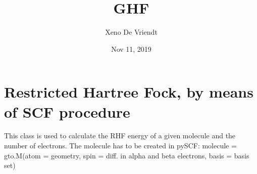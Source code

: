 \documentclass[letterpaper,10pt,english]{sphinxmanual}
\title{GHF}
\date{Nov 11, 2019}
\author{Xeno De Vriendt}
\begin{document}
\pagestyle{empty}
\sphinxmaketitle
\pagestyle{plain}
\sphinxtableofcontents
\pagestyle{normal}
\label{\detokenize{index::doc}}

\label{\detokenize{RHF:module-ghf.RHF}}

\chapter{Restricted Hartree Fock, by means of SCF procedure}
\label{\detokenize{RHF:restricted-hartree-fock-by-means-of-scf-procedure}}\label{\detokenize{RHF::doc}}
This class is used to calculate the RHF energy of a given molecule and the number of electrons.
The molecule has to be created in pySCF:
molecule = gto.M(atom = geometry, spin = diff. in alpha and beta electrons, basis = basis set)
\end{document}
